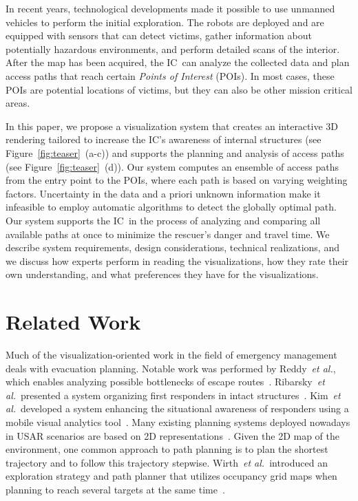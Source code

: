 \documentclass{egpubl}
\def\etal{\textit{et al.}}
\def\IC{IC}
\begin{document}
In recent years, technological developments made it possible to use unmanned vehicles to perform the initial exploration. The robots are deployed and are equipped with sensors that can detect victims, gather information about potentially hazardous environments, and perform detailed scans of the interior. After the map has been acquired, the \IC\ can analyze the collected data and plan access paths that reach certain \emph{Points of Interest} (POIs). In most cases, these POIs are potential locations of victims, but they can also be other mission critical areas.

In this paper, we propose a visualization system that creates an interactive 3D rendering tailored to increase the \IC 's awareness of internal structures (see Figure~\ref{fig:teaser}~(a-c)) and supports the planning and analysis of access paths (see Figure~\ref{fig:teaser}~(d)). Our system computes an ensemble of access paths from the entry point to the POIs, where each path is based on varying weighting factors. Uncertainty in the data and a priori unknown information make it infeasible to employ automatic algorithms to detect the globally optimal path. Our system supports the \IC\ in the process of analyzing and comparing all available paths at once to minimize the rescuer's danger and travel time. We describe system requirements, design considerations, technical realizations, and we discuss how experts perform in reading the visualizations, how they rate their own understanding, and what preferences they have for the visualizations.


\section{Related Work} \label{sec:relatedwork}
 Much of the visualization-oriented work  in the field of emergency management deals with evacuation planning. Notable work was performed by Reddy~\etal, which enables analyzing possible bottlenecks of escape routes~\cite{EuroVA12:13-17:2012}. Ribarsky~\etal\ presented a system organizing first responders in intact structures~\cite{Ribarsky:2010}. Kim~\etal\ developed a system enhancing the situational awareness of responders using a mobile visual analytics tool~\cite{Kim:2008}. Many existing planning systems deployed nowadays in USAR scenarios are based on 2D representations~\cite{kleiner_et_al_ssrr09,KohlbrecherMeyerStrykKlingaufFlexibleSlamSystem2011}. Given the 2D map of the environment, one common approach to path planning is to plan the shortest trajectory and to follow this trajectory stepwise. Wirth~\etal\ introduced an exploration strategy and path planner that utilizes occupancy grid maps when planning to reach several targets at the same time~\cite{Wirth2007ETA1}.
\end{document}
